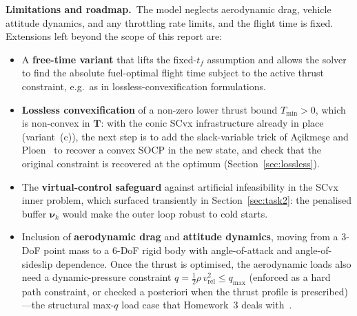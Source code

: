 \documentclass[../main.tex]{subfiles}
\begin{document}
\textbf{Limitations and roadmap.}\ The model neglects aerodynamic drag, vehicle attitude dynamics, and any throttling rate limits, and the flight time is fixed. Extensions left beyond the scope of this report are:
\begin{itemize}
    \item A \textbf{free-time variant} that lifts the fixed-$t_f$ assumption and allows the solver to find the absolute fuel-optimal flight time subject to the active thrust constraint, e.g.\ as in lossless-convexification formulations.
    \item \textbf{Lossless convexification} of a non-zero lower thrust bound $T_{\min} > 0$, which is non-convex in $\mathbf{T}$: with the conic SCvx infrastructure already in place (variant~(c)), the next step is to add the slack-variable trick of A\c{c}ikme\c{s}e and Ploen~\cite{acikmese2007} to recover a convex SOCP in the new state, and check that the original constraint is recovered at the optimum (Section~\ref{sec:lossless}).
    \item The \textbf{virtual-control safeguard} against artificial infeasibility in the SCvx inner problem, which surfaced transiently in Section~\ref{sec:task2}: the penalised buffer $\boldsymbol{\nu}_k$ would make the outer loop robust to cold starts.
    \item Inclusion of \textbf{aerodynamic drag} and \textbf{attitude dynamics}, moving from a 3-DoF point mass to a 6-DoF rigid body with angle-of-attack and angle-of-sideslip dependence. Once the thrust is optimised, the aerodynamic loads also need a dynamic-pressure constraint $q = \tfrac{1}{2}\rho\,v_{\mathrm{rel}}^2 \leq q_{\max}$ (enforced as a hard path constraint, or checked a posteriori when the thrust profile is prescribed)---the structural max-$q$ load case that Homework~3 deals with~\cite[Sec.~4.4.8]{benedikter2022}.
\end{itemize}
\end{document}
